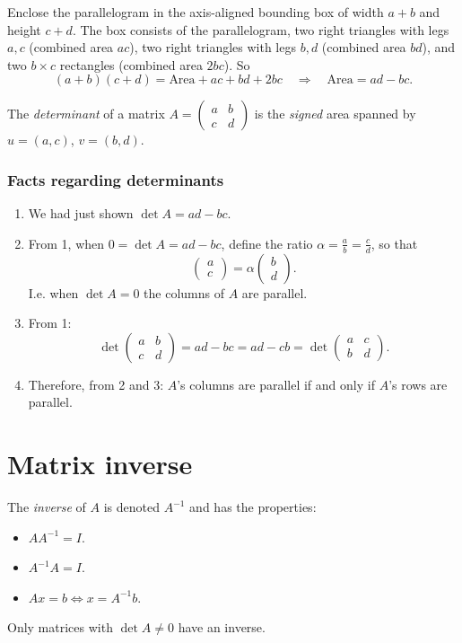 Enclose the parallelogram in the axis-aligned bounding box of width
$a+b$ and height $c+d$. The box consists of the parallelogram, two
right triangles with legs $a,c$ (combined area $ac$), two right
triangles with legs $b,d$ (combined area $bd$), and two $b\times c$
rectangles (combined area $2bc$). So
\[
(a+b)(c+d) = \text{Area} + ac + bd + 2bc
\quad\Longrightarrow\quad
\text{Area} = ad - bc.
\]

\begin{definition}
The \emph{determinant} of a matrix
$A=\begin{pmatrix}a&b\\c&d\end{pmatrix}$ is the \emph{signed} area
spanned by $u=(a,c)$, $v=(b,d)$. 
\end{definition}
\subsubsection{Facts regarding determinants}
\begin{enumerate}
\item We had just shown $\det A = ad-bc$.

\item From 1, when $0 = \det A = ad-bc$, define the ratio $\alpha =
  \frac{a}{b} = \frac{c}{d}$, so that
\[
\begin{pmatrix}a\\c\end{pmatrix} = \alpha \begin{pmatrix}b\\d\end{pmatrix}.
\]
I.e. when $\det A = 0$ the columns of $A$ are parallel.

\item From 1:
\[
\det \begin{pmatrix}a&b\\c&d\end{pmatrix} = ad-bc = ad-cb =
\det \begin{pmatrix}a&c\\b&d\end{pmatrix}.
\]
 \item Therefore, from 2 and 3: $A$'s columns are parallel if and only
   if $A$'s rows are parallel.
\end{enumerate}
\section{Matrix inverse}
The \emph{inverse} of $A$ is denoted $A^{-1}$ and has the properties:
\begin{itemize}
\item $AA^{-1} = I$.
\item $A^{-1} A = I$.
\item $Ax = b \Longleftrightarrow x = A^{-1}b$.
\end{itemize}
Only matrices with $\det A \neq 0$ have an inverse.

